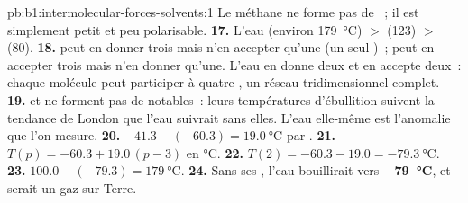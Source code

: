 \begin{solution}{pb:b1:intermolecular-forces-solvents:1}
Le méthane ne forme pas de ~; il est simplement petit
et peu polarisable.
\textbf{17.} L'eau (environ \qty{179}{\celsius}) $>$  (123) $>$
 (80).
\textbf{18.}  peut en donner trois mais n'en accepter qu'une (un
seul )~;  peut en accepter trois mais n'en donner
qu'une. L'eau en donne deux et en accepte deux~: chaque molécule peut
participer à quatre , un réseau tridimensionnel
complet.
\textbf{19.}  et  ne forment pas de 
notables~: leurs températures d'ébullition suivent la tendance de London
que l'eau suivrait sans elles. L'eau elle-même est l'anomalie que l'on
mesure.
\textbf{20.} $-41.3 - (-60.3) = \qty{19.0}{\celsius}$ par .
\textbf{21.} $T(p) = -60.3 + 19.0\,(p - 3)$ en \unit{\celsius}.
\textbf{22.} $T(2) = -60.3 - 19.0 = \qty{-79.3}{\celsius}$.
\textbf{23.} $100.0 - (-79.3) = \qty{179}{\celsius}$.
\textbf{24.} Sans ses , l'eau bouillirait vers
\textbf{\qty{-79}{\celsius}}, et serait un gaz sur Terre.
\end{solution}
